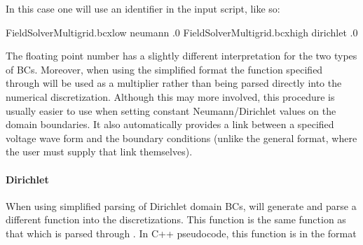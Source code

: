 \documentclass[letterpaper,10pt,english]{sphinxmanual}
\begin{document}
\sphinxAtStartPar
In this case one will use an identifier  in the input script, like so:

\begin{sphinxVerbatim}[commandchars=\\\{\},formatcom=\scriptsize]
FieldSolverMultigrid.bc\PYGZus{}x\PYGZus{}low   neumann   .0
FieldSolverMultigrid.bc\PYGZus{}x\PYGZus{}high  dirichlet .0
\end{sphinxVerbatim}

\sphinxAtStartPar
The floating point number has a slightly different interpretation for the two types of BCs.
Moreover, when using the simplified format the function specified through  will be used as a multiplier rather than being parsed directly into the numerical discretization.
Although this may  more involved, this procedure is usually easier to use when setting constant Neumann/Dirichlet values on the domain boundaries.
It also automatically provides a link between a specified voltage wave form and the boundary conditions (unlike the general format, where the user must supply that link themselves).


\paragraph{Dirichlet}
\label{\detokenize{Solvers/Electrostatics:dirichlet}}
\sphinxAtStartPar
When using simplified parsing of Dirichlet domain BCs,  will generate and parse a different function into the discretizations.
This function is  the same function as that which is parsed through .
In C++ pseudo\sphinxhyphen{}code, this function is in the format

\begin{sphinxVerbatim}[commandchars=\\\{\},formatcom=\scriptsize]
 

   \PYG{p}{[} \PYG{p}{]}        
         
\end{sphinxVerbatim}
\end{document}
